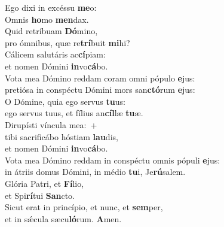 \evenverse Ego dixi in excéssu \textbf{me}o:~\*\\
\evenverse Omnis \textbf{ho}mo \textbf{men}dax.\\
\oddverse Quid retríbuam \textbf{Dó}mino,~\*\\
\oddverse pro ómnibus, quæ re\textbf{trí}buit \textbf{mi}hi?\\
\evenverse Cálicem salutáris ac\textbf{cí}piam:~\*\\
\evenverse et nomen Dómini \textbf{in}vo\textbf{cá}bo.\\
\oddverse Vota mea Dómino reddam coram omni pópulo \textbf{e}jus:~\*\\
\oddverse pretiósa in conspéctu Dómini mors san\textbf{ctó}rum \textbf{e}jus:\\
\evenverse O Dómine, quia ego servus \textbf{tu}us:~\*\\
\evenverse ego servus tuus, et fílius an\textbf{cíl}læ \textbf{tu}æ.\\
\oddverse Dirupísti víncula mea:~+\\
\oddverse  tibi sacrificábo hóstiam \textbf{lau}dis,~\*\\
\oddverse et nomen Dómini \textbf{in}vo\textbf{cá}bo.\\
\evenverse Vota mea Dómino reddam in conspéctu omnis pópuli \textbf{e}jus:~\*\\
\evenverse in átriis domus Dómini, in médio \textbf{tu}i, Je\textbf{rú}salem.\\
\oddverse Glória Patri, et \textbf{Fí}lio,~\*\\
\oddverse et Spi\textbf{rí}tui \textbf{San}cto.\\
\evenverse Sicut erat in princípio, et nunc, et \textbf{sem}per,~\*\\
\evenverse et in sǽcula sæcu\textbf{ló}rum. \textbf{A}men.\\
